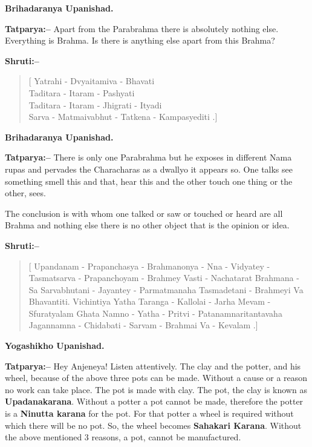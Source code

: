 \begin{flushright}
\textbf{Brihadaranya Upanishad.}
\end{flushright}

\textbf{Tatparya:–} Apart from the Parabrahma there is absolutely nothing else. Everything is Brahma. Is there is anything else apart from this Brahma?

\textbf{Shruti:–}

\begin{verse}
[ Yatrahi - Dvyaitamiva - Bhavati \\ Taditara - Itaram - Pashyati \\ Taditara - Itaram - Jhigrati - Ityadi \\ Sarva - Matmaivabhut - Tatkena - Kampasyediti .]
\end{verse}

\begin{flushright}
\textbf{Brihadaranya Upanishad.}
\end{flushright}

\textbf{Tatparya:–} There is only one Parabrahma but he exposes in different Nama rupas and pervades the Characharas as a dwallyo it appears so. One talks see something smell this and that, hear this and the other touch one thing or the other, sees.

The conclusion is with whom one talked or saw or touched or heard are all Brahma and nothing else there is no other object that is the opinion or idea.

\textbf{Shruti:–}

\begin{verse}
[ Upandanam - Prapanchasya - Brahmanonya - Nna - Vidyatey - Tasmatsarva - Prapanchoyam - Brahmey Vasti - Nachatarat  Brahmana - Sa Sarvabhutani - Jayantey - Parmatmanaha  Tasmadetani - Brahmeyi Va Bhavantiti. Vichintiya  Yatha Taranga - Kallolai - Jarha Mevam - Sfuratyalam  Ghata Namno - Yatha - Pritvi - Patanamnaritantavaha  Jagannamna - Chidabati - Sarvam - Brahmai Va - Kevalam .]
\end{verse}

\begin{flushright}
\textbf{Yogashikho Upanishad.}
\end{flushright}

\textbf{Tatparya:–} Hey Anjeneya! Listen attentively. The clay and the potter, and his wheel, because of the above three pots can be made. Without a cause or a reason no work can take place. The pot is made with clay. The pot, the clay is known as \textbf{Upadanakarana}. Without a potter a pot cannot be made, therefore the potter is a \textbf{Ninutta karana} for the pot. For that potter a wheel is required without which there will be no pot. So, the wheel becomes \textbf{Sahakari Karana}. Without the above mentioned 3 reasons, a pot, cannot be manufactured.


